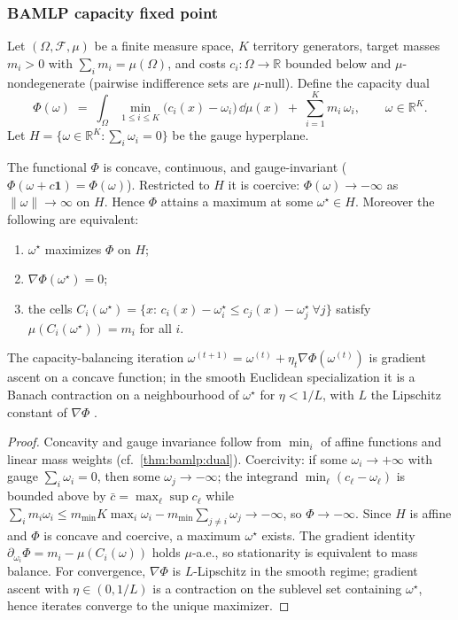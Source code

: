 \subsubsection{BAMLP capacity fixed point}

Let $(\Omega,\mathcal{F},\mu)$ be a finite measure space, $K$ territory
generators, target masses $m_i>0$ with $\sum_i m_i=\mu(\Omega)$, and costs
$c_i:\Omega\to\mathbb{R}$ bounded below and $\mu$-nondegenerate (pairwise
indifference sets are $\mu$-null). Define the capacity dual
\begin{equation}
  \Phi(\omega)\;=\;\int_\Omega \min_{1\le i\le K}\bigl(c_i(x)-\omega_i\bigr)\,\dd\mu(x)
  \;+\;\sum_{i=1}^{K} m_i\,\omega_i,
  \qquad \omega\in\mathbb{R}^K.
  \label{eq:bamlp:phi}
\end{equation}
Let $H=\{\omega\in\mathbb{R}^K:\sum_i\omega_i=0\}$ be the gauge hyperplane.

\begin{theorem}\label{thm:bamlp:capacity-fp}
The functional $\Phi$ is concave, continuous, and gauge-invariant
($\Phi(\omega+c\mathbf{1})=\Phi(\omega)$). Restricted to $H$ it is coercive:
$\Phi(\omega)\to-\infty$ as $\|\omega\|\to\infty$ on $H$. Hence $\Phi$
attains a maximum at some $\omega^\star\in H$. Moreover the following are
equivalent:
\begin{enumerate}[label=\textup{(\roman*)}]
  \item $\omega^\star$ maximizes $\Phi$ on $H$;
  \item $\nabla\Phi(\omega^\star)=0$;
  \item the cells $C_i(\omega^\star)=\{x:\,c_i(x)-\omega^\star_i\le
    c_j(x)-\omega^\star_j\ \forall j\}$ satisfy $\mu(C_i(\omega^\star))=m_i$
    for all $i$.
\end{enumerate}
The capacity-balancing iteration $\omega^{(t+1)}=\omega^{(t)}+\eta_t\nabla\Phi
(\omega^{(t)})$ is gradient ascent on a concave function; in the smooth
Euclidean specialization it is a Banach contraction on a neighbourhood of
$\omega^\star$ for $\eta<1/L$, with $L$ the Lipschitz constant of $\nabla\Phi$
\cite{BAMLP:2026}.
\end{theorem}

\begin{proof}
Concavity and gauge invariance follow from $\min_i$ of affine functions and
linear mass weights (cf.\ \autoref{thm:bamlp:dual}). Coercivity: if some
$\omega_i\to+\infty$ with gauge $\sum_i\omega_i=0$, then some $\omega_j\to
-\infty$; the integrand $\min_\ell(c_\ell-\omega_\ell)$ is bounded above by
$\bar c=\max_\ell\sup c_\ell$ while $\sum_i m_i\omega_i\le m_{\min} K
\max_i\omega_i - m_{\min}\sum_{j\ne i}\omega_j\to-\infty$, so $\Phi\to-\infty$.
Since $H$ is affine and $\Phi$ is concave and coercive, a maximum $\omega^\star$
exists. The gradient identity
$\partial_{\omega_i}\Phi=m_i-\mu(C_i(\omega))$ holds $\mu$-a.e., so
stationarity is equivalent to mass balance. For convergence, $\nabla\Phi$ is
$L$-Lipschitz in the smooth regime; gradient ascent with $\eta\in(0,1/L)$ is a
contraction on the sublevel set containing $\omega^\star$, hence iterates
converge to the unique maximizer.
\end{proof}

